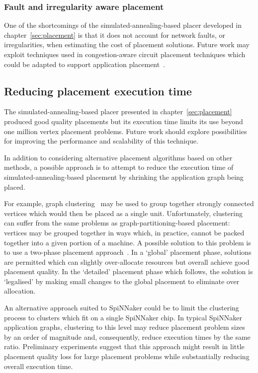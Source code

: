 			\subsubsection{Fault and irregularity aware placement}
				
				One of the shortcomings of the simulated-annealing-based placer
				developed in chapter~\ref{sec:placement} is that it does not account
				for network faults, or irregularities, when estimating the cost of
				placement solutions.  Future work may exploit techniques used in
				congestion-aware circuit placement techniques which could be adapted to
				support application placement~\cite{viswanathan07}.
		
		\subsection{Reducing placement execution time}
			
			The simulated-annealing-based placer presented in
			chapter~\ref{sec:placement} produced good quality placements but its
			execution time limits its use beyond one million vertex placement
			problems. Future work should explore possibilities for improving the
			performance and scalability of this technique.
			
			In addition to considering alternative placement algorithms based on
			other methods, a possible approach is to attempt to reduce the execution
			time of simulated-annealing-based placement by shrinking the application
			graph being placed.
			
			For example, graph clustering~\cite{schaeffer07} may be used to group
			together strongly connected vertices which would then be placed as a
			single unit.  Unfortunately, clustering can suffer from the same problems
			as graph-partitioning-based placement: vertices may be grouped together
			in ways which, in practice, cannot be packed together into a given portion
			of a machine.  A possible solution to this problem is to use a two-phase
			placement approach~\cite{kahng11}. In a `global' placement phase,
			solutions are permitted which can slightly over-allocate resources but
			overall achieve good placement quality. In the `detailed' placement phase
			which follows, the solution is `legalised' by making small changes to the
			global placement to eliminate over allocation.
			
			An alternative approach suited to SpiNNaker could be to limit the
			clustering process to clusters which fit on a single SpiNNaker chip. In
			typical SpiNNaker application graphs, clustering to this level may reduce
			placement problem sizes by an order of magnitude and, consequently,
			reduce execution times by the same ratio. Preliminary experiments suggest
			that this approach might result in little placement quality loss for
			large placement problems while substantially reducing overall execution
			time.
		
